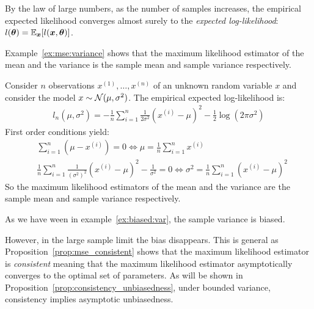 By the law of large numbers, as the number of samples increases, the empirical
expected likelihood converges almost surely to the \emph{expected
  log-likelihood}: $l(\boldsymbol{\theta}) = \mathbb{E}_{\boldsymbol{x}}[l(\boldsymbol{x}, \boldsymbol{\theta})]$.

Example~\ref{ex:mse:variance} shows that the maximum likelihood estimator of the
mean and the variance is the sample mean and sample variance respectively.
\begin{example}
  \label{ex:mse:variance}
  Consider $n$ observations $x^{(1)}, \dots, x^{(n)}$ of an unknown random variable $x$
  and consider the model $x \sim \mathcal{N}(\mu, \sigma^2)$.
  The empirical expected log-likelihood is:
  \begin{align}
    l_n(\mu, \sigma^2) = -\frac1{n} \sum_{i=1}^n \frac1{2 \sigma^2}(x^{(i)} - \mu)^2 - \frac12 \log(2\pi \sigma^2)
  \end{align}
  First order conditions
  yield:
  \begin{align}
    &\sum_{i=1}^n (\mu - x^{(i)}) = 0 \iff \mu = \frac1{n} \sum_{i=1}^n x^{(i)} \\
    &\frac1{n} \sum_{i=1}^n \frac1{(\sigma^2)^2}(x^{(i)} - \mu)^2 - \frac1{\sigma^2} = 0 \iff \sigma^2 = \frac1{n} \sum_{i=1}^n(x^{(i)} - \mu)^2
  \end{align}
  So the maximum likelihood estimators of the mean and the variance are the
  sample mean and sample variance respectively.
\end{example}
As we have ween in example~\ref{ex:biased:var}, the sample variance is biased.

However, in the large sample limit the bias disappears. This is general as
Proposition~\ref{prop:mse_consistent} shows that the maximum likelihood
estimator is \emph{consistent} meaning that the maximum likelihood estimator
asymptotically converges to the optimal set of parameters. As will be
shown in Proposition~\ref{prop:consistency_unbiasedness}, under
bounded variance, consistency implies asymptotic unbiasedness.


